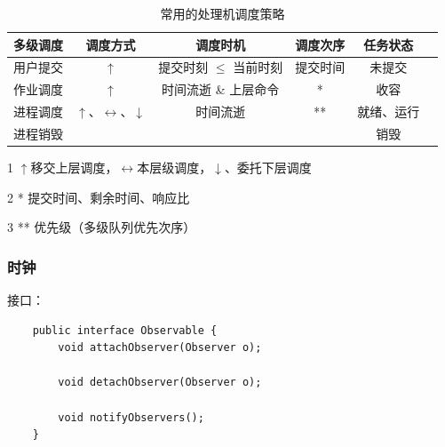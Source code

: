\documentclass[12pt, a4paper, UTF8]{ctexart}
\begin{document}
\begin{table}[htbp]
    \caption{常用的处理机调度策略}
    \centering

    \begin{threeparttable}
        \begin{tabular}{cccccc}
            \toprule
            多级调度 & 调度方式                                    & 调度时机                 & 调度次序 & 任务状态   \\
            \midrule
            用户提交 & $\uparrow$                                  & 提交时刻 $\leq$ 当前时刻 & 提交时间 & 未提交     \\
            作业调度 & $\uparrow$                                  & 时间流逝 \& 上层命令     & *        & 收容       \\
            进程调度 & $\uparrow$、$\leftrightarrow$、$\downarrow$ & 时间流逝                 & **       & 就绪、运行 \\
            进程销毁 &                                             &                          &          & 销毁       \\
            \bottomrule
        \end{tabular}

        \begin{tablenotes}
            \item [1]   $\uparrow$移交上层调度，$\leftrightarrow$本层级调度，$\downarrow$、委托下层调度
            \item [2]   * 提交时间、剩余时间、响应比
            \item [3]   ** 优先级（多级队列优先次序）
        \end{tablenotes}

    \end{threeparttable}
    \qquad
\end{table}

\subsubsection{时钟}
接口：
\begin{verbatim}
    public interface Observable {
        void attachObserver(Observer o);

        void detachObserver(Observer o);

        void notifyObservers();
    }
\end{verbatim}
\end{document}
